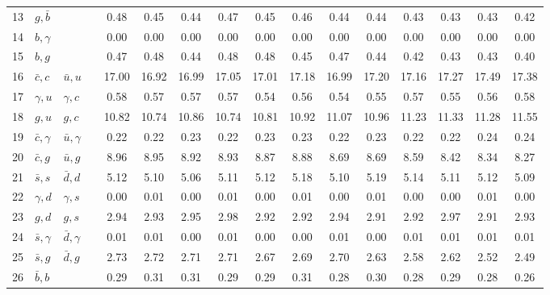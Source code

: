 \begin{tabularx}{\textwidth}{rXXX@{}S@{}S@{}S@{}S@{}S@{}S@{}S@{}S@{}S@{}S@{}S@{}S}
 13 & $g,\bar b$       &                  &                 &  0.48 &  0.45 &  0.44 &  0.47 &  0.45 &  0.46 &  0.44 &  0.44 &  0.43 &  0.43 &  0.43 &  0.42 \\
 14 & $b,\gamma$       &                  &                 &  0.00 &  0.00 &  0.00 &  0.00 &  0.00 &  0.00 &  0.00 &  0.00 &  0.00 &  0.00 &  0.00 &  0.00 \\
 15 & $b,g$            &                  &                 &  0.47 &  0.48 &  0.44 &  0.48 &  0.48 &  0.45 &  0.47 &  0.44 &  0.42 &  0.43 &  0.43 &  0.40 \\
 16 & $\bar c,c$       & $\bar u,u$       &                 & 17.00 & 16.92 & 16.99 & 17.05 & 17.01 & 17.18 & 16.99 & 17.20 & 17.16 & 17.27 & 17.49 & 17.38 \\
 17 & $\gamma, u$      & $\gamma, c$      &                 &  0.58 &  0.57 &  0.57 &  0.57 &  0.54 &  0.56 &  0.54 &  0.55 &  0.57 &  0.55 &  0.56 &  0.58 \\
 18 & $g,u$            & $g,c$            &                 & 10.82 & 10.74 & 10.86 & 10.74 & 10.81 & 10.92 & 11.07 & 10.96 & 11.23 & 11.33 & 11.28 & 11.55 \\
 19 & $\bar c,\gamma$  & $\bar u,\gamma$  &                 &  0.22 &  0.22 &  0.23 &  0.22 &  0.23 &  0.23 &  0.22 &  0.23 &  0.22 &  0.22 &  0.24 &  0.24 \\
 20 & $\bar c, g$      & $\bar u, g$      &                 &  8.96 &  8.95 &  8.92 &  8.93 &  8.87 &  8.88 &  8.69 &  8.69 &  8.59 &  8.42 &  8.34 &  8.27 \\
 21 & $\bar s, s$      & $\bar d, d$      &                 &  5.12 &  5.10 &  5.06 &  5.11 &  5.12 &  5.18 &  5.10 &  5.19 &  5.14 &  5.11 &  5.12 &  5.09 \\
 22 & $\gamma, d$      & $\gamma, s$      &                 &  0.00 &  0.01 &  0.00 &  0.01 &  0.00 &  0.01 &  0.00 &  0.01 &  0.00 &  0.00 &  0.01 &  0.00 \\
 23 & $g,d$            & $g,s$            &                 &  2.94 &  2.93 &  2.95 &  2.98 &  2.92 &  2.92 &  2.94 &  2.91 &  2.92 &  2.97 &  2.91 &  2.93 \\
 24 & $\bar s,\gamma$  & $\bar d,\gamma$  &                 &  0.01 &  0.01 &  0.00 &  0.01 &  0.00 &  0.00 &  0.01 &  0.00 &  0.01 &  0.01 &  0.01 &  0.01 \\
 25 & $\bar s,g$       & $\bar d, g$      &                 &  2.73 &  2.72 &  2.71 &  2.71 &  2.67 &  2.69 &  2.70 &  2.63 &  2.58 &  2.62 &  2.52 &  2.49 \\
 26 & $\bar b,b$       &                  &                 &  0.29 &  0.31 &  0.31 &  0.29 &  0.29 &  0.31 &  0.28 &  0.30 &  0.28 &  0.29 &  0.28 &  0.26 \\

\end{tabularx}
